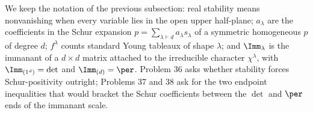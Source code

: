 We keep the notation of the previous subsection: real stability means nonvanishing when every variable lies in the open upper half-plane; $a_\lambda$ are the coefficients in the Schur expansion $p=\sum_{\lambda\vdash d}a_\lambda s_\lambda$ of a symmetric homogeneous $p$ of degree $d$; $f^\lambda$ counts standard Young tableaux of shape $\lambda$; and $\Imm_\lambda$ is the immanant of a $d\times d$ matrix attached to the irreducible character $\chi^\lambda$, with $\Imm_{(1^d)}=\det$ and $\Imm_{(d)}=\per$.  Problem 36 asks whether stability forces Schur-positivity outright; Problems 37 and 38 ask for the two endpoint inequalities that would bracket the Schur coefficients between the $\det$ and $\per$ ends of the immanant scale.
